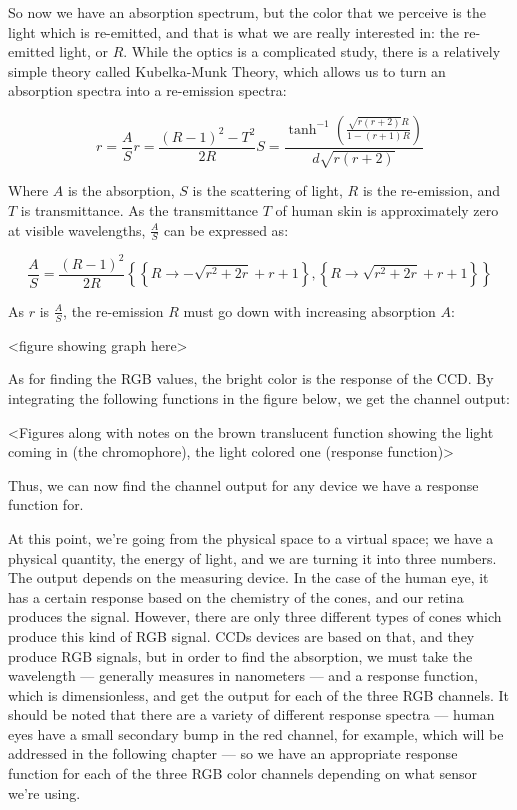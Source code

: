 So now we have an absorption spectrum, but the color that we perceive is the light which is re-emitted, and that is what we are really interested in: the re-emitted light, or $R$. While the optics is a complicated study, there is a relatively simple theory called Kubelka-Munk Theory, which allows us to turn an absorption spectra into a re-emission spectra:

\begin{equation}\label{eq:KubelkaMunk}
r=\frac{A}{S}
r=\frac{(R-1)^2-T^2}{2 R}
S=\frac{\tanh ^{-1}\left(\frac{\sqrt{r (r+2)} R}{1-(r+1) R}\right)}{d \sqrt{r (r+2)}}
\end{equation}

Where $A$ is the absorption, $S$ is the scattering of light, $R$ is the re-emission, and $T$ is transmittance. As the transmittance $T$ of human skin is approximately zero at visible wavelengths, $\frac{A}{S}$ can be expressed as:

\begin{equation}\label{eq:KubelkaMunk2}
\frac{A}{S}=\frac{(R-1)^2}{2 R}
\left\{\left\{R\to -\sqrt{r^2+2 r}+r+1\right\},\left\{R\to \sqrt{r^2+2 r}+r+1\right\}\right\}
\end{equation}

As $r$ is $\frac{A}{S}$, the re-emission $R$ must go down with increasing absorption $A$:

<figure showing graph here>

As for finding the RGB values, the bright color is the response of the CCD. By integrating the following functions in the figure below, we get the channel output:

<Figures along with notes on the brown translucent function showing the light coming in (the chromophore), the light colored one (response function)>

Thus, we can now find the channel output for any device we have a response function for.

At this point, we're going from the physical space to a virtual space; we have a physical quantity, the energy of light, and we are turning it into three numbers. The output depends on the measuring device. In the case of the human eye, it has a certain response based on the chemistry of the cones, and our retina produces the signal. However, there are only three different types of cones which produce this kind of RGB signal. CCDs devices are based on that, and they produce RGB signals, but in order to find the absorption, we must take the wavelength --- generally measures in nanometers --- and a response function, which is dimensionless, and get the output for each of the three RGB channels. It should be noted that there are a variety of different response spectra --- human eyes have a small secondary bump in the red channel, for example, which will be addressed in the following chapter --- so we have an appropriate response function for each of the three RGB color channels depending on what sensor we're using.

